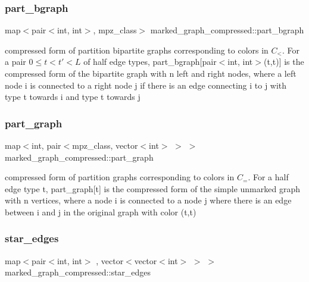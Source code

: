 \subsubsection{\texorpdfstring{part\+\_\+bgraph}{part\_bgraph}}
{\footnotesize\ttfamily map$<$pair$<$int, int$>$, mpz\+\_\+class$>$ marked\+\_\+graph\+\_\+compressed\+::part\+\_\+bgraph}



compressed form of partition bipartite graphs corresponding to colors in $C_<$. For a pair $0 \leq t < t' < L$ of half edge types, part\+\_\+bgraph\mbox{[}pair$<$int, int$>$(t,t\textquotesingle{})\mbox{]} is the compressed form of the bipartite graph with n left and right nodes, where a left node i is connected to a right node j if there is an edge connecting i to j with type t towards i and type t\textquotesingle{} towards j 

\mbox{\label{classmarked__graph__compressed_ae179a4737e6eab905c18a94d44ef64b7}} 
\subsubsection{\texorpdfstring{part\+\_\+graph}{part\_graph}}
{\footnotesize\ttfamily map$<$int, pair$<$mpz\+\_\+class, vector$<$int$>$ $>$ $>$ marked\+\_\+graph\+\_\+compressed\+::part\+\_\+graph}



compressed form of partition graphs corresponding to colors in $C_=$. For a half edge type t, part\+\_\+graph\mbox{[}t\mbox{]} is the compressed form of the simple unmarked graph with n vertices, where a node i is connected to a node j where there is an edge between i and j in the original graph with color (t,t) 

\mbox{\label{classmarked__graph__compressed_a7df5779d313486644132bd816937f532}} 
\subsubsection{\texorpdfstring{star\+\_\+edges}{star\_edges}}
{\footnotesize\ttfamily map$<$pair$<$int, int$>$ , vector$<$vector$<$int$>$ $>$ $>$ marked\+\_\+graph\+\_\+compressed\+::star\+\_\+edges}




